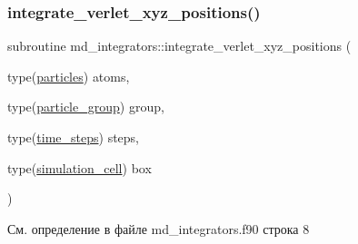 \mbox{\label{namespacemd__integrators_a46897b8968c1901883654589ef731eb2}} 
\subsubsection{\texorpdfstring{integrate\+\_\+verlet\+\_\+xyz\+\_\+positions()}{integrate\_verlet\_xyz\_positions()}}
{\footnotesize\ttfamily subroutine md\+\_\+integrators\+::integrate\+\_\+verlet\+\_\+xyz\+\_\+positions (\begin{DoxyParamCaption}\item[{type(\mbox{\hyperlink{structmd__general_1_1particles}{particles}})}]{atoms,  }\item[{type(\mbox{\hyperlink{structmd__general_1_1particle__group}{particle\+\_\+group}})}]{group,  }\item[{type(\mbox{\hyperlink{structmd__general_1_1time__steps}{time\+\_\+steps}})}]{steps,  }\item[{type(\mbox{\hyperlink{structmd__general_1_1simulation__cell}{simulation\+\_\+cell}})}]{box }\end{DoxyParamCaption})}



См. определение в файле md\+\_\+integrators.\+f90 строка 8


